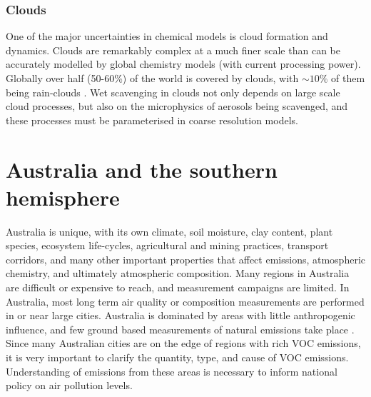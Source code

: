       
    
    \subsubsection{Clouds}
      \label{LR:Models:Uncert:Clouds}
      One of the major uncertainties in chemical models is cloud formation and dynamics.
      Clouds are remarkably complex at a much finer scale than can be accurately modelled by global chemistry models (with current processing power).
      Globally over half (50-60\%) of the world is covered by clouds, with $\sim10\%$ of them being rain-clouds \parencite{Kanakidou2005}.
      Wet scavenging in clouds not only depends on large scale cloud processes, but also on the microphysics of aerosols being scavenged, and these processes must be parameterised in coarse resolution models.
    

\section{Australia and the southern hemisphere}
\label{LR:Aus}
  
  Australia is unique, with its own climate, soil moisture, clay content, plant species, ecosystem life-cycles, agricultural and mining practices, transport corridors, and many other important properties that affect emissions, atmospheric chemistry, and ultimately atmospheric composition.
  Many regions in Australia are difficult or expensive to reach, and measurement campaigns are limited.
  In Australia, most long term air quality or composition measurements are performed in or near large cities.
  Australia is dominated by areas with little anthropogenic influence, and few ground based measurements of natural emissions take place \parencite{VanDerA2008}.
  Since many Australian cities are on the edge of regions with rich VOC emissions, it is very important to clarify the quantity, type, and cause of VOC emissions.
  Understanding of emissions from these areas is necessary to inform national policy on air pollution levels.
  
